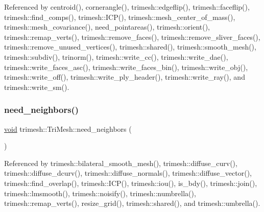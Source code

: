 Referenced by centroid(), cornerangle(), trimesh\+::edgeflip(), trimesh\+::faceflip(), trimesh\+::find\+\_\+comps(), trimesh\+::\+I\+C\+P(), trimesh\+::mesh\+\_\+center\+\_\+of\+\_\+mass(), trimesh\+::mesh\+\_\+covariance(), need\+\_\+pointareas(), trimesh\+::orient(), trimesh\+::remap\+\_\+verts(), trimesh\+::remove\+\_\+faces(), trimesh\+::remove\+\_\+sliver\+\_\+faces(), trimesh\+::remove\+\_\+unused\+\_\+vertices(), trimesh\+::shared(), trimesh\+::smooth\+\_\+mesh(), trimesh\+::subdiv(), trinorm(), trimesh\+::write\+\_\+cc(), trimesh\+::write\+\_\+dae(), trimesh\+::write\+\_\+faces\+\_\+asc(), trimesh\+::write\+\_\+faces\+\_\+bin(), trimesh\+::write\+\_\+obj(), trimesh\+::write\+\_\+off(), trimesh\+::write\+\_\+ply\+\_\+header(), trimesh\+::write\+\_\+ray(), and trimesh\+::write\+\_\+sm().

\mbox{\label{classtrimesh_1_1TriMesh_ab99a19ac0bbd0e71b8ffbea3d21f34b2}} 
\subsubsection{\texorpdfstring{need\+\_\+neighbors()}{need\_neighbors()}}
{\footnotesize\ttfamily \hyperlink{namespacetrimesh_a784ddfd979e1c579bda795a8edfc3f43}{void} trimesh\+::\+Tri\+Mesh\+::need\+\_\+neighbors (\begin{DoxyParamCaption}{ }\end{DoxyParamCaption})}



Referenced by trimesh\+::bilateral\+\_\+smooth\+\_\+mesh(), trimesh\+::diffuse\+\_\+curv(), trimesh\+::diffuse\+\_\+dcurv(), trimesh\+::diffuse\+\_\+normals(), trimesh\+::diffuse\+\_\+vector(), trimesh\+::find\+\_\+overlap(), trimesh\+::\+I\+C\+P(), trimesh\+::iou(), is\+\_\+bdy(), trimesh\+::join(), trimesh\+::lmsmooth(), trimesh\+::noisify(), trimesh\+::numbrella(), trimesh\+::remap\+\_\+verts(), resize\+\_\+grid(), trimesh\+::shared(), and trimesh\+::umbrella().

\mbox{\label{classtrimesh_1_1TriMesh_af054bdc872873245f640cd545155ecb2}} 
